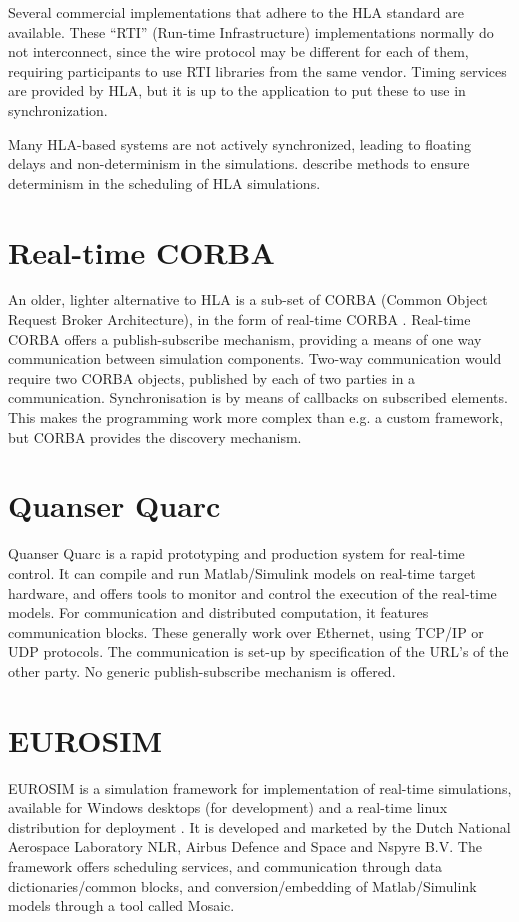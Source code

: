 \documentclass[11pt,a4paper,twoside]{scrreprt}
\begin{document}
Several commercial implementations that adhere to the HLA standard are available. These ``RTI'' (Run-time Infrastructure) implementations normally do not interconnect, since the wire protocol may be different for each of them, requiring participants to use RTI libraries from the same vendor. Timing services are provided by HLA, but it is up to the application to put these to use in synchronization.

Many HLA-based systems are not actively synchronized, leading to floating delays and non-determinism in the simulations. \cite{mclean_middleware_2004} describe methods to ensure determinism in the scheduling of HLA simulations.

\section{Real-time CORBA}

An older, lighter alternative to HLA is a sub-set of CORBA (Common Object Request Broker Architecture), in the form of real-time CORBA \cite{schmidt_overview_2000}. Real-time CORBA offers a publish-subscribe mechanism, providing a means of one way communication between simulation components. Two-way communication would require two CORBA objects, published by each of two parties in a communication. Synchronisation is by means of callbacks on subscribed elements. This makes the programming work more complex than e.g. a custom framework, but CORBA provides the discovery mechanism.

\section{Quanser Quarc}

Quanser Quarc is a rapid prototyping and production system for real-time control\cite{_quanser_2016}. It can compile and run Matlab/Simulink models on real-time target hardware, and offers tools to monitor and control the execution of the real-time models. For communication and distributed computation, it features communication blocks. These generally work over Ethernet, using TCP/IP or UDP protocols. The communication is set-up by specification of the URL's of the other party. No generic publish-subscribe mechanism is offered.

\section{EUROSIM}

EUROSIM is a simulation framework for implementation of real-time simulations, available for Windows desktops (for development) and a real-time linux distribution for deployment \cite{_eurosim_2016}. It is developed and marketed by the Dutch National Aerospace Laboratory NLR, Airbus Defence and Space and Nspyre B.V. The framework offers scheduling services, and communication through data dictionaries/common blocks, and conversion/embedding of Matlab/Simulink models through a tool called Mosaic.
\end{document}
